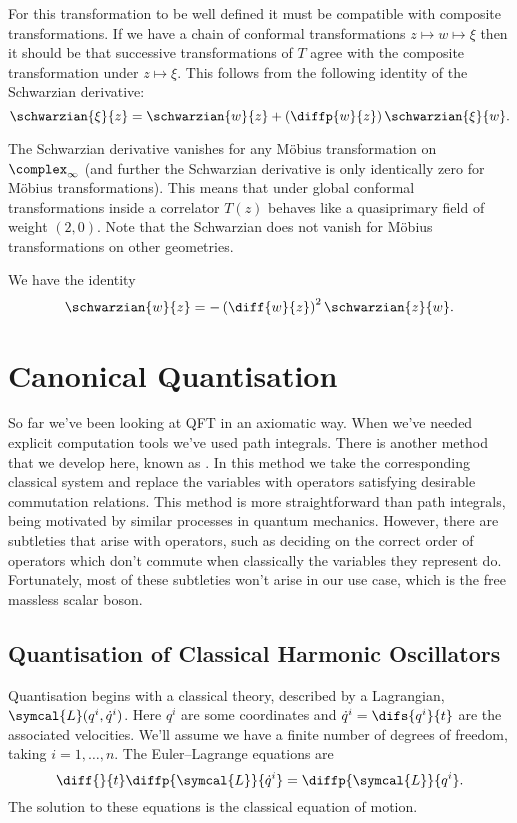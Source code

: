 \documentclass[fleqn]{NotesClass}
\newcommand{\lagrangian}{\symcal{L}}
\begin{document}
    For this transformation to be well defined it must be compatible with composite transformations.
    If we have a chain of conformal transformations \(z \mapsto w \mapsto \xi\) then it should be that successive transformations of \(T\) agree with the composite transformation under \(z \mapsto \xi\).
    This follows from the following identity of the Schwarzian derivative:
    \begin{equation}
        \schwarzian{\xi}{z} = \schwarzian{w}{z} + \left( \diffp{w}{z} \right) \schwarzian{\xi}{w}.
    \end{equation}
    
    The Schwarzian derivative vanishes for any M\"obius transformation on \(\complex_{\infty}\) (and further the Schwarzian derivative is only identically zero for M\"obius transformations).
    This means that under global conformal transformations inside a correlator \(T(z)\) behaves like a quasiprimary field of weight \((2, 0)\).
    Note that the Schwarzian does not vanish for M\"obius transformations on other geometries.
    
    We have the identity
    \begin{equation}
        \schwarzian{w}{z} = -\left( \diff{w}{z} \right)^2 \schwarzian{z}{w}.
    \end{equation}
    
    \chapter{Canonical Quantisation}
    So far we've been looking at QFT in an axiomatic way.
    When we've needed explicit computation tools we've used path integrals.
    There is another method that we develop here, known as .
    In this method we take the corresponding classical system and replace the variables with operators satisfying desirable commutation relations.
    This method is more straightforward than path integrals, being motivated by similar processes in quantum mechanics.
    However, there are subtleties that arise with operators, such as deciding on the correct order of operators which don't commute when classically the variables they represent do.
    Fortunately, most of these subtleties won't arise in our use case, which is the free massless scalar boson.
    
    \section{Quantisation of Classical Harmonic Oscillators}
    Quantisation begins with a classical theory, described by a Lagrangian, \(\lagrangian(q^i, \dot{q}^i)\).
    Here \(q^i\) are some coordinates and \(\dot{q}^i = \difs{q^i}{t}\) are the associated velocities.
    We'll assume we have a finite number of degrees of freedom, taking \(i = 1, \dotsc, n\).
    The Euler--Lagrange equations are
    \begin{equation}
        \diff{}{t} \diffp{\lagrangian}{\dot{q}^i} = \diffp{\lagrangian}{q^i}.
    \end{equation}
    The solution to these equations is the classical equation of motion.
    
\end{document}
